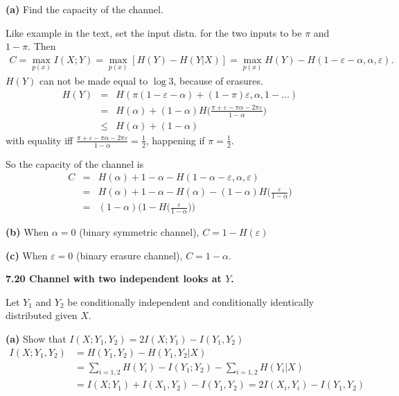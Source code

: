 \documentclass[10pt]{article}
\begin{document}
\begin{tiny}
\begin{multicols}{3}
\textbf{(a)} Find the capacity of the channel.

Like example in the text, set the input distn. for the two inputs to be $\pi$ and $1-\pi$. Then
\begin{align*}
    C = \max_{p(x)}I(X;Y) = \max_{p(x)}[H(Y) - H(Y|X)] = \max_{p(x)}H(Y) - H(1-\varepsilon-\alpha,\alpha,\varepsilon).
\end{align*}
$H(Y)$ can not be made equal to $\log 3$, because of erasures. 
\begin{eqnarray*}
    H(Y) &=& H( \pi(1-\varepsilon-\alpha) + (1-\pi)\varepsilon,\alpha, 1 - \dots)\\ %
    &=& H(\alpha) + (1-\alpha)H\bigg(\frac{\pi+\varepsilon -\pi\alpha-2\pi\varepsilon}{1-\alpha}\bigg) \\
    &\le& H(\alpha) + (1-\alpha)
\end{eqnarray*}
with equality iff $\frac{\pi+\varepsilon -\pi\alpha-2\pi\varepsilon}{1-\alpha} = \frac{1}{2}$, happening if $\pi = \frac{1}{2}$.

So the capacity of the channel is
\begin{eqnarray*}
    C &=& H(\alpha) + 1 - \alpha - H(1-\alpha-\varepsilon,\alpha,\varepsilon) \\
    &=& H(\alpha) + 1 - \alpha - H(\alpha) - (1-\alpha) H\bigg(\frac{\varepsilon}{1-\alpha}\bigg) \\
    &=& (1-\alpha) \bigg(1 - H\bigg(\frac{\varepsilon}{1-\alpha}\bigg)\bigg)
\end{eqnarray*}

\textbf{(b)} When $\alpha = 0$ (binary symmetric channel), $C = 1- H(\varepsilon)$

\textbf{(c)} When $\varepsilon = 0$ (binary erasure channel), $C=1-\alpha$.

\textbf{\scriptsize 7.20 Channel with two independent looks at $Y$.}

Let $Y_1$ and $Y_2$ be conditionally independent and conditionally identically distributed given $X$.

\textbf{(a)} Show that $I(X;Y_1, Y_2) = 2I(X;Y_1) - I(Y_1,Y_2)$
\begin{align*}
    I(X;Y_1,Y_2) &= H(Y_1,Y_2) - H(Y_1,Y_2 | X) \\
    &= \sum_{i=1,2} H(Y_i) - I(Y_1;Y_2) - \sum_{i=1,2} H (Y_i|X) \\
    &= I(X;Y_1) + I(X_1,Y_2) - I(Y_1,Y_2) = 2I(X_i,Y_i) - I(Y_1,Y_2)
\end{align*}


\end{multicols}
\end{tiny}
\end{document}

